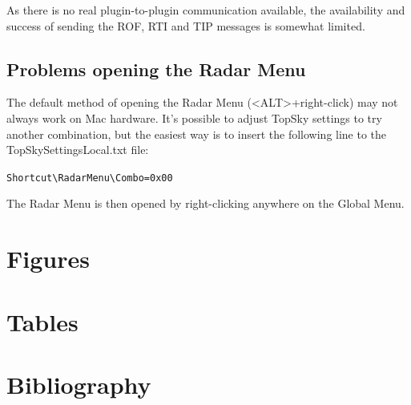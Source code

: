 \documentclass[a4paper,oneside,11pt]{memoir}
\begin{document}
As there is no real plugin-to-plugin communication available, the availability and success of sending the ROF, RTI and TIP messages is somewhat limited.

\section{Problems opening the Radar Menu}

The default method of opening the Radar Menu (<ALT>+right-click) may not always work on Mac hardware. It’s possible to adjust TopSky settings to try another combination, but the easiest way is to insert the following line to the TopSkySettingsLocal.txt file:

\verb|Shortcut\RadarMenu\Combo=0x00|

The Radar Menu is then opened by right-clicking anywhere on the Global Menu.

\appendix

\chapter{Figures}

\begin{KeepFromToc}
\listoffigures
\end{KeepFromToc}

\chapter{Tables}

\begin{KeepFromToc}
\listoftables
\end{KeepFromToc}

\chapter{Bibliography}
\begin{KeepFromToc}
\nocite{*}
\printbibliography
\end{KeepFromToc}
\end{document}
